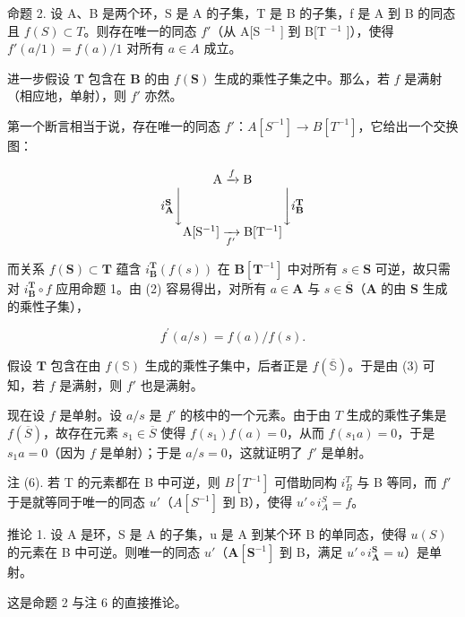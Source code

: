 命题 2. 设 A、B 是两个环，S 是 A 的子集，T 是 B 的子集，f 是 A 到 B 的同态且 \(f(S) \subset T\)。则存在唯一的同态 \(f'\)（从 A{[}S \(^{-1}\) {]} 到 B{[}T \(^{-1}\) {]}），使得 \(f'(a/1) = f(a)/1\) 对所有 \(a \in A\) 成立。

进一步假设 \(\mathbf{T}\) 包含在 \(\mathbf{B}\) 的由 \(f(\mathbf{S})\) 生成的乘性子集之中。那么，若 \(f\) 是满射（相应地，单射），则 \(f'\) 亦然。

第一个断言相当于说，存在唯一的同态 \(f'\)：\(A[S^{-1}] \to B[T^{-1}]\)，它给出一个交换图：

\[
\begin{array}{c} \mathrm{A} \xrightarrow {f} \mathrm{B} \\ i _ {\mathbf {A}} ^ {\mathbf {S}} \Biggl \downarrow \qquad \qquad \qquad \qquad \Biggl \downarrow i _ {\mathbf {B}} ^ {\mathbf {T}} \\ \mathrm{A} [ \mathrm{S} ^ {- 1} ] \xrightarrow [ f ^ {\prime} ]{} \mathrm{B} [ \mathrm{T} ^ {- 1} ] \end{array}
\]

而关系 \(f(\mathbf{S}) \subset \mathbf{T}\) 蕴含 \(i_{\mathbf{B}}^{\mathbf{T}}(f(s))\) 在 \(\mathbf{B}[\mathbf{T}^{-1}]\) 中对所有 \(s \in \mathbf{S}\) 可逆，故只需对 \(i_{\mathbf{B}}^{\mathbf{T}} \circ f\) 应用命题 1。由 (2) 容易得出，对所有 \(a \in \mathbf{A}\) 与 \(s \in \overline{\mathbf{S}}\)（\(\mathbf{A}\) 的由 \(\mathbf{S}\) 生成的乘性子集），

\[
f ^ {\prime} (a / s) = f (a) / f (s).\tag{3}
\]

假设 \(\mathbf{T}\) 包含在由 \(f(\mathbb{S})\) 生成的乘性子集中，后者正是 \(f(\overline{\mathbb{S}})\)。于是由 (3) 可知，若 \(f\) 是满射，则 \(f'\) 也是满射。

现在设 \(f\) 是单射。设 \(a / s\) 是 \(f'\) 的核中的一个元素。由于由 \(T\) 生成的乘性子集是 \(f(\overline{S})\)，故存在元素 \(s_1 \in \overline{S}\) 使得 \(f(s_1)f(a) = 0\)，从而 \(f(s_1a) = 0\)，于是 \(s_1a = 0\)（因为 \(f\) 是单射）；于是 \(a / s = 0\)，这就证明了 \(f'\) 是单射。

注 (6). 若 T 的元素都在 B 中可逆，则 \(B[T^{-1}]\) 可借助同构 \(i_{B}^{T}\) 与 B 等同，而 \(f'\) 于是就等同于唯一的同态 \(u'\)（\(A[S^{-1}]\) 到 B），使得 \(u' \circ i_{A}^{S} = f\)。

推论 1. 设 A 是环，S 是 A 的子集，u 是 A 到某个环 B 的单同态，使得 \(u(S)\) 的元素在 B 中可逆。则唯一的同态 \(u'\)（\(\mathbf{A}[\mathbf{S}^{-1}]\) 到 B，满足 \(u' \circ i_{\mathbf{A}}^{\mathbf{S}} = u\)）是单射。

这是命题 2 与注 6 的直接推论。

